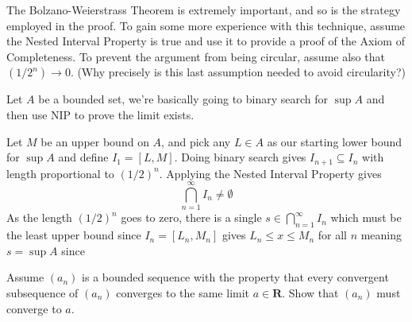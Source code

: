 \begin{solution}
\end{solution}

\begin{exercise}
  The Bolzano-Weierstrass Theorem is extremely important, and so is the strategy employed in the proof. To gain some more experience with this technique, assume the Nested Interval Property is true and use it to provide a proof of the Axiom of Completeness. To prevent the argument from being circular, assume also that $\left(1 / 2^{n}\right) \rightarrow 0$. (Why precisely is this last assumption needed to avoid circularity?)
\end{exercise}

\begin{solution}
  Let $A$ be a bounded set, we're basically going to binary search for $\sup A$ and then use NIP to prove the limit exists.

  Let $M$ be an upper bound on $A$, and pick any $L \in A$ as our starting lower bound for $\sup A$ and define $I_1 = [L, M]$. Doing binary search gives $I_{n+1} \subseteq I_n$ with length proportional to $(1/2)^n$. Applying the Nested Interval Property gives
  $$
  \bigcap_{n=1}^\infty I_n \ne \emptyset
  $$
  As the length $(1/2)^n$ goes to zero, there is a single $s \in \bigcap_{n=1}^\infty I_n$ which must be the least upper bound since $I_n = [L_n, M_n]$ gives $L_n \le x \le M_n$ for all $n$ meaning $s = \sup A$ since
\end{solution}

\begin{exercise}
  Assume $\left(a_{n}\right)$ is a bounded sequence with the property that every convergent subsequence of $\left(a_{n}\right)$ converges to the same limit $a \in \mathbf{R}$. Show that $\left(a_{n}\right)$ must converge to $a$.
\end{exercise}

